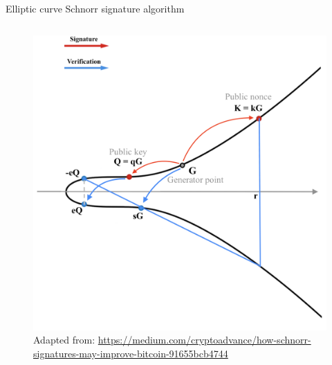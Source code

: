 \documentclass[slidescentered]{beamer}
\newcommand{\source}[1]{\caption*{\tiny Adapted from: {#1}} }
\begin{document}
\begin{frame}{Elliptic curve Schnorr signature algorithm}
\begin{columns}
\begin{column}{0.5\linewidth}
\begin{figure}
{						\source{\tiny \url{https://medium.com/cryptoadvance/how-schnorr-signatures-may-improve-bitcoin-91655bcb4744}}}
					 {\vspace*{-0.5cm}
						\hspace*{-1cm}
						\includegraphics[scale=0.29]{images/Schnorr6}
						\source{\tiny \url{https://medium.com/cryptoadvance/how-schnorr-signatures-may-improve-bitcoin-91655bcb4744}}}
				\end{figure}
			\end{column}
		\end{columns}
	\end{frame}
\end{document}
